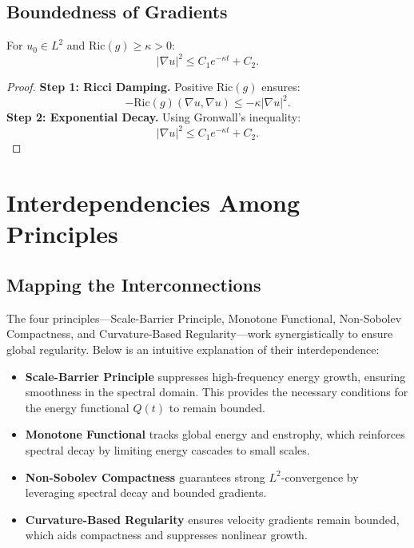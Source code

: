 \subsection{Boundedness of Gradients}
\begin{theorem}
For $u_0 \in L^2$ and $\text{Ric}(g) \geq \kappa > 0$:
\begin{equation}
|\nabla u|^2 \leq C_1 e^{-\kappa t} + C_2.
\end{equation}
\end{theorem}

\begin{proof}
\textbf{Step 1: Ricci Damping.} Positive $\text{Ric}(g)$ ensures:
\begin{equation}
-\text{Ric}(g)(\nabla u, \nabla u) \leq -\kappa |\nabla u|^2.
\end{equation}
\textbf{Step 2: Exponential Decay.} Using Gronwall's inequality:
\begin{equation}
|\nabla u|^2 \leq C_1 e^{-\kappa t} + C_2.
\end{equation}
\end{proof}

\section{Interdependencies Among Principles}

\subsection{Mapping the Interconnections}
The four principles---Scale-Barrier Principle, Monotone Functional, Non-Sobolev Compactness, and Curvature-Based Regularity---work synergistically to ensure global regularity. Below is an intuitive explanation of their interdependence:

\begin{itemize}
    \item \textbf{Scale-Barrier Principle} suppresses high-frequency energy growth, ensuring smoothness in the spectral domain. This provides the necessary conditions for the energy functional $Q(t)$ to remain bounded.
    \item \textbf{Monotone Functional} tracks global energy and enstrophy, which reinforces spectral decay by limiting energy cascades to small scales.
    \item \textbf{Non-Sobolev Compactness} guarantees strong $L^2$-convergence by leveraging spectral decay and bounded gradients.
    \item \textbf{Curvature-Based Regularity} ensures velocity gradients remain bounded, which aids compactness and suppresses nonlinear growth.
\end{itemize}

